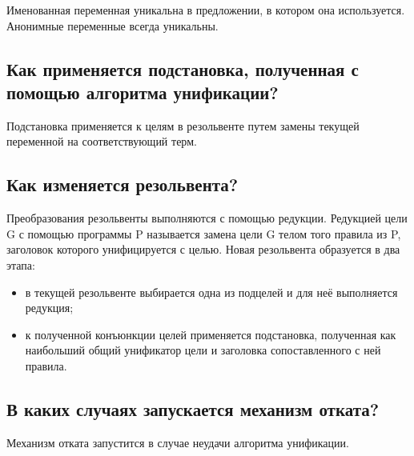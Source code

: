 Именованная переменная уникальна в предложении, в котором она используется. Анонимные переменные всегда уникальны.

\subsection*{Как применяется подстановка, полученная с помощью алгоритма унификации?}

Подстановка применяется к целям в резольвенте путем замены текущей переменной на соответствующий терм.

\subsection*{Как изменяется резольвента?}

Преобразования резольвенты выполняются с помощью редукции. Редукцией цели G с помощью программы P называется замена цели G телом того правила из P, заголовок которого унифицируется с целью. Новая резольвента образуется в два этапа:
\begin{itemize}
    \item в текущей резольвенте выбирается одна из подцелей и для неё выполняется редукция;
    \item к полученной конъюнкции целей применяется подстановка, полученная как наибольший общий унификатор цели и заголовка сопоставленного с ней правила.
\end{itemize}

\subsection*{В каких случаях запускается механизм отката?}

Механизм отката запустится в случае неудачи алгоритма унификации.